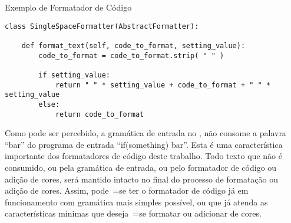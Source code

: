 \begin{quadro}[!htb]
\begin{bluebox}
\begin{code}
\label{exemploDeFormatadorDeCodigo}
\caption{Exemplo de Formatador de Código}
\begin{verbatim}
class SingleSpaceFormatter(AbstractFormatter):

    def format_text(self, code_to_format, setting_value):
        code_to_format = code_to_format.strip( " " )

        if setting_value:
            return " " * setting_value + code_to_format + " " * setting_value
        else:
            return code_to_format
\end{verbatim}
\end{code}
\end{bluebox}
\end{quadro}

Como pode ser percebido,
a gramática de entrada no ,
não consome a palavra ``bar'' do programa de entrada ``if(something) bar''.
Esta é uma característica importante dos formatadores de código deste trabalho.
Todo texto que não é consumido,
ou pela gramática de entrada,
ou pelo formatador de código ou
adição de cores,
será mantido intacto no final do processo de formatação ou
adição de cores.
Assim,
pode~=se ter o formatador de código já em funcionamento com gramática mais simples possível,
ou que já atenda as características mínimas que deseja~=se formatar ou
adicionar de cores.
